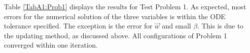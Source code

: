 Table \ref{TabA1:Prob1} displays the results for Test Problem 1. As expected, most errors for the numerical solution of the three variables is within the ODE tolerance specified. The exception is the error for $\vec{w}$ and small $\beta$. This is due to the updating method, as discussed above. All configurations of Problem 1 converged within one iteration. 

%




\vspace{0.75em}

